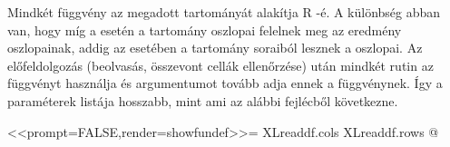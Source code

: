 Mindkét függvény az  megadott tartományát alakítja R
-é. A különbség 
abban van, hogy míg a  esetén a tartomány oszlopai
felelnek meg az eredmény  
 oszlopainak, addig az  esetében
a tartomány soraiból lesznek a  
oszlopai. 
Az előfeldolgozás (beolvasás, összevont cellák ellenőrzése) után
mindkét rutin az  
függvényt használja és  argumentumot tovább adja ennek a
függvénynek. Így a paraméterek listája hosszabb, mint ami az alábbi
fejlécből következne.  
\begin{Rnw}
<<prompt=FALSE,render=showfundef>>=
XLreaddf.cols
XLreaddf.rows
@
\end{Rnw}
